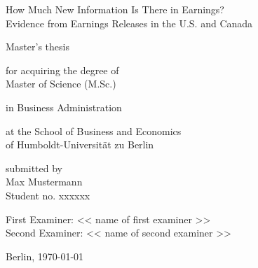 \begin{titlepage}
    \color{black}  %
    \thispagestyle{empty}
  
    \vspace*{2cm}
  
    {\Large
    \noindent How Much New Information Is There in Earnings?\\
    Evidence from Earnings Releases in the U.S. and Canada}
  
    \vspace{2cm}
  
    {\LARGE
    \noindent
    Master’s thesis}
  
    \vspace{2cm}
  
    {\normalsize
    \noindent for acquiring the degree of\\
    Master of Science (M.Sc.)

    \vspace{0.5cm}

    \noindent in Business Administration
  
    \vspace{0.5cm}
  
    \noindent at the School of Business and Economics\\
    of Humboldt-Universität zu Berlin
  
    \vspace{2cm}
  
    \noindent submitted by\\
    Max Mustermann\\
    Student no. xxxxxx
  
    \vspace{2cm}
  
    \noindent First Examiner: << name of first examiner >>\\
    Second Examiner: << name of second examiner >>
  
    \vspace{1cm}
  
    \noindent Berlin, \today
    }
  
\end{titlepage}